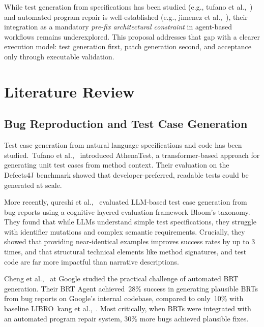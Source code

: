 \documentclass[12pt]{article}
\begin{document}
While test generation from specifications has been studied (e.g., tufano et al.,~\cite{Tufano2020AthenaTest}) and automated program repair is well-established (e.g., jimenez et al.,~\cite{Jimenez2023SWEbench}), their integration as a mandatory \emph{pre-fix architectural constraint} in agent-based workflows remains underexplored. This proposal addresses that gap with a clearer execution model: test generation first, patch generation second, and acceptance only through executable validation.


\section{Literature Review}

\subsection{Bug Reproduction and Test Case Generation}

Test case generation from natural language specifications and code has been studied.~Tufano et al.,~\cite{Tufano2020AthenaTest} introduced AthenaTest, a transformer-based approach for generating unit test cases from method context. Their evaluation on the Defects4J benchmark showed that developer-preferred, readable tests could be generated at scale.

More recently, qureshi et al.,~\cite{Qureshi2025TestCase} evaluated LLM-based test case generation from bug reports using a cognitive layered evaluation framework Bloom's taxonomy. They found that while LLMs understand simple test specifications, they struggle with identifier mutations and complex semantic requirements. Crucially, they showed that providing near-identical examples improves success rates by up to 3 times, and that structural technical elements like method signatures, and test code are far more impactful than narrative descriptions.

Cheng et al.,~\cite{Cheng2025Agentic} at Google studied the practical challenge of automated BRT generation. Their BRT Agent achieved~28\% success in generating plausible BRTs from bug reports on Google's internal codebase, compared to only~10\% with baseline LIBRO~kang et al.,~\cite{Kang2023LIBRO}. Most critically, when BRTs were integrated with an automated program repair system, 30\% more bugs achieved plausible fixes.
\end{document}
